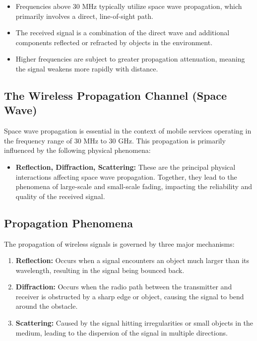 \begin{itemize}
    \item Frequencies above 30 MHz typically utilize space wave propagation, which primarily involves a direct, line-of-sight path.
    \item The received signal is a combination of the direct wave and additional components reflected or refracted by objects in the environment.
    \item Higher frequencies are subject to greater propagation attenuation, meaning the signal weakens more rapidly with distance.
\end{itemize}





\subsection*{The Wireless Propagation Channel (Space Wave)}

Space wave propagation is essential in the context of mobile services operating in the frequency range of 30 MHz to 30 GHz. This propagation is primarily influenced by the following physical phenomena:

\begin{itemize}
    \item \textbf{Reflection, Diffraction, Scattering:} These are the principal physical interactions affecting space wave propagation. Together, they lead to the phenomena of large-scale and small-scale fading, impacting the reliability and quality of the received signal.
\end{itemize}



\subsection*{Propagation Phenomena}

The propagation of wireless signals is governed by three major mechanisms:

\begin{enumerate}
    \item \textbf{Reflection:} Occurs when a signal encounters an object much larger than its wavelength, resulting in the signal being bounced back.
    \item \textbf{Diffraction:} Occurs when the radio path between the transmitter and receiver is obstructed by a sharp edge or object, causing the signal to bend around the obstacle.
    \item \textbf{Scattering:} Caused by the signal hitting irregularities or small objects in the medium, leading to the dispersion of the signal in multiple directions.
\end{enumerate}

